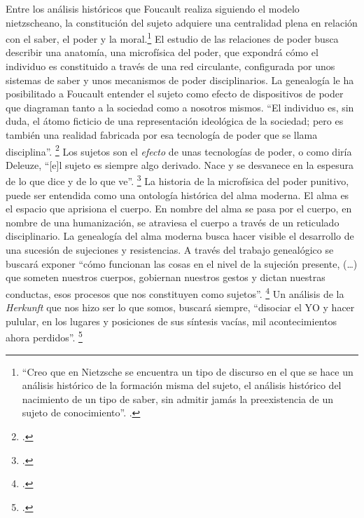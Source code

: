 Entre los análisis históricos que Foucault realiza siguiendo el modelo nietzscheano, la constitución del sujeto adquiere una centralidad plena en relación con el saber, el poder y la moral.\footnote{\enquote{Creo que en Nietzsche se encuentra un tipo de discurso en el que se hace un análisis histórico de la formación misma del sujeto, el análisis histórico del nacimiento de un tipo de saber, sin admitir jamás la preexistencia de un sujeto de conocimiento}. \cite[][18]{@7049-FOUCAULT2008}.} El estudio de las relaciones de poder busca describir una anatomía, una microfísica del poder, que expondrá cómo el individuo es constituido a través de una red circulante, configurada por unos sistemas de saber y unos mecanismos de poder disciplinarios. La genealogía le ha posibilitado a Foucault entender el sujeto como efecto de dispositivos de poder que diagraman tanto a la sociedad como a nosotros mismos. \enquote{El individuo es, sin duda, el átomo ficticio de una representación ideológica de la sociedad; pero es también una realidad fabricada por esa tecnología de poder que se llama disciplina}. \footcite[][198]{@7054-FOUCAULT2004} Los sujetos son el \emph{efecto} de unas tecnologías de poder, o como diría Deleuze, \enquote{{[}e{]}l sujeto es siempre algo derivado. Nace y se desvanece en la espesura de lo que dice y de lo que ve}. \footcite[][173]{@7050-DELEUZE1996} La historia de la microfísica del poder punitivo, puede ser entendida como una ontología histórica del alma moderna. El alma es el espacio que aprisiona el cuerpo. En nombre del alma se pasa por el cuerpo, en nombre de una humanización, se atraviesa el cuerpo a través de un reticulado disciplinario. La genealogía del alma moderna busca hacer visible el desarrollo de una sucesión de sujeciones y resistencias. A través del trabajo genealógico se buscará exponer \enquote{cómo funcionan las cosas en el nivel de la sujeción presente, (\ldots) que someten nuestros cuerpos, gobiernan nuestros gestos y dictan nuestras conductas, esos procesos que nos constituyen como sujetos}. \footcite[][104]{@7046-DIAZ2005} Un análisis de la \emph{Herkunft} que nos hizo ser lo que somos, buscará siempre, \enquote{disociar el YO y hacer pulular, en los lugares y posiciones de sus síntesis vacías, mil acontecimientos ahora perdidos}. \footcite[][26]{@7047-FOUCAULT2008}

